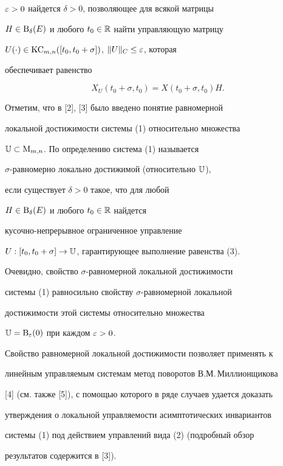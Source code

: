 $\varepsilon>0$ найдется $\delta>0$, позволяющее для всякой матрицы


$H\in\mathrm B_{\delta}(E)$ и любого $t_0\in\Bbb R$ найти управляющую матрицу


$U(\cdot)\in\mathrm{KC}_{m,n}([t_0,t_0+\sigma])$, $\|U\|_C\le\varepsilon$, которая


обеспечивает равенство


\begin{equation}


X_U(t_0+\sigma,t_0)=X(t_0+\sigma,t_0)H.


\end{equation}





Отметим, что в [2], [3] было введено понятие равномерной


локальной достижимости системы (1) относительно множества


$\Bbb U\subset\mathrm M_{m,n}$. По определению система (1) называется


$\sigma$-равномерно локально достижимой (относительно $\Bbb U$),


если существует $\delta>0$ такое, что для любой


$H\in\mathrm B_{\delta}(E)$ и любого $t_0\in\Bbb R$ найдется


кусочно-непрерывное ограниченное управление


$U:[t_0,t_0+\sigma]\to\Bbb U$, гарантирующее выполнение равенства (3).


Очевидно, свойство $\sigma$-равномерной локальной достижимости


системы (1) равносильно свойству $\sigma$-равномерной локальной


достижимости этой системы относительно множества


$\Bbb U=\mathrm B_{\varepsilon}(0)$ при каждом $\varepsilon>0$.





Свойство равномерной локальной достижимости позволяет применять к


линейным управляемым системам метод поворотов В.М.\,Миллионщикова


[4] (см. также [5]), с помощью которого в ряде случаев удается доказать


утверждения о локальной управляемости асимптотических инвариантов


системы (1) под действием управлений вида (2) (подробный обзор


результатов содержится в [3]).





